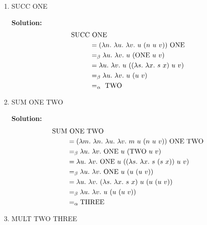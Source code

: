 \documentclass[11pt]{report}
\begin{document}
\begin{enumerate}
	\begin{enumerate}
		\item SUCC ONE
		
		{\bf Solution:}
			\begin{align*}
				\SUCC &\ \ONE \\
				&= (\lambda n. \ \lambda u. \ \lambda v. \ u \ (n \ u \ v) ) \ \ONE \\
				&\beq \lambda u. \ \lambda v. \ u \ (\ONE \ u \ v) \\
				&= \lambda u. \ \lambda v. \ u \ ((\lambda s. \ \lambda x. \ s \ x) \ u \ v) \\
				&\beq \lambda u. \ \lambda v. \ u \ (u \ v) \\
				&\aeq \ \TWO 
			\end{align*}


		\item SUM ONE TWO 
		
		{\bf Solution:}
			\begin{align*}
				\SUM &\ \ONE \ \TWO \\
				&= (\lambda m. \ \lambda n. \ \lambda u. \ \lambda v. \ m \ u\ (n \ u \ v)) \ \ONE \ \TWO \\ 
				&\beq \lambda u. \ \lambda v. \ \ONE \ u\ (\TWO \ u \ v) \\
				&= \lambda u. \ \lambda v. \ \ONE \ u\ ((\lambda s. \ \lambda x. \ s \ (s \ x)) \ u \ v) \\
				&\beq \lambda u. \ \lambda v. \ \ONE \ u\ (u \ (u \ v)) \\
				&= \lambda u. \ \lambda v. \ (\lambda s. \ \lambda x. \ s \ x) \ u\ (u \ (u \ v)) \\
				&\beq \lambda u. \ \lambda v. \ u\ (u \ (u \ v))\\
				&\aeq \THREE
			\end{align*}

		\item MULT TWO THREE 
		

\end{enumerate}
\end{enumerate}
\end{document}
